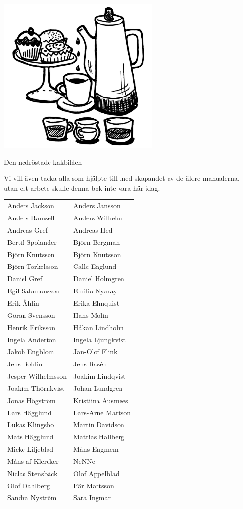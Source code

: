 \documentclass[a6paper,fontsize=10pt,twoside,open=right]{scrbook}
\begin{document}
\vfill
\begin{center}
  \noindent\includegraphics[keepaspectratio,width=0.6\textwidth]{elements/punsch1.jpg}\par
  \noindent \footnotesize{Den nedröstade kakbilden}
\end{center}
\vfill
\null
\newpage
Vi vill även tacka alla som hjälpte till med skapandet av de äldre
manualerna, utan ert arbete skulle denna bok inte vara här idag.\par
\vspace{10pt}
\begin{tabular}{@{}p{}p{}@{}}
  Anders Jackson & Anders Jansson\\
  Anders Ramsell & Anders Wilhelm\\
  Andreas Gref & Andreas Hed\\
  Bertil Spolander & Björn Bergman\\
  Björn Knutsson & Björn Knutsson\\
  Björn Torkelsson & Calle Englund\\
  Daniel Gref & Daniel Holmgren\\
  Egil Salomonsson & Emilio Nyaray\\
  Erik Åhlin & Erika Elmquist\\
  Göran Svensson & Hans Molin\\
  Henrik Eriksson & Håkan Lindholm\\
  Ingela Anderton & Ingela Ljungkvist\\
  Jakob Engblom & Jan-Olof Flink\\
  Jens Bohlin & Jens Rosén\\
  Jesper Wilhelmsson & Joakim Lindqvist\\
  Joakim Thörnkvist & Johan Lundgren\\
  Jonas Högström & Kristiina Ausmees\\
  Lars Hägglund & Lars-Arne Mattson\\
  Lukas Klingsbo & Martin Davidson\\
  Mats Hägglund & Mattias Hallberg\\
  Micke Liljeblad & Måns Engmem\\
  Måns af Klercker & NeNNe\\
  Niclas Stensbäck & Olof Appelblad\\
  Olof Dahlberg & Pär Mattsson\\
  Sandra Nyström & Sara Ingmar
\end{tabular}
\newpage
{}
\end{document}
